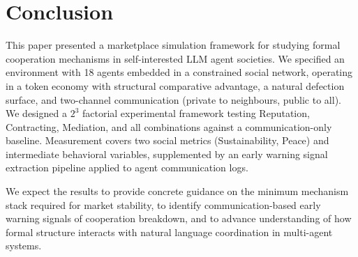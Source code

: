 \documentclass[12pt, a4paper]{article}
\begin{document}
\section{Conclusion}
\label{sec:conclusion}


This paper presented a marketplace simulation framework for studying formal cooperation mechanisms in self-interested LLM agent societies. We specified an environment with 18 agents embedded in a constrained social network, operating in a token economy with structural comparative advantage, a natural defection surface, and two-channel communication (private to neighbours, public to all). We designed a $2^3$ factorial experimental framework testing Reputation, Contracting, Mediation, and all combinations against a communication-only baseline. Measurement covers two social metrics (Sustainability, Peace) and intermediate behavioral variables, supplemented by an early warning signal extraction pipeline applied to agent communication logs.

We expect the results to provide concrete guidance on the minimum mechanism stack required for market stability, to identify communication-based early warning signals of cooperation breakdown, and to advance understanding of how formal structure interacts with natural language coordination in multi-agent systems.

\end{document}
